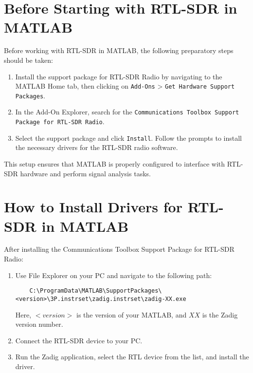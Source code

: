 \section*{Before Starting with RTL-SDR in MATLAB}

Before working with RTL-SDR in MATLAB, the following preparatory steps should be taken:

\begin{enumerate}
    \item Install the support package for RTL-SDR Radio by navigating to the MATLAB Home tab, then clicking on \texttt{Add-Ons} > \texttt{Get Hardware Support Packages}.
    \item In the Add-On Explorer, search for the \texttt{Communications Toolbox Support Package for RTL-SDR Radio}.
    \item Select the support package and click \texttt{Install}. Follow the prompts to install the necessary drivers for the RTL-SDR radio software.
\end{enumerate}
This setup ensures that MATLAB is properly configured to interface with RTL-SDR hardware and perform signal analysis tasks.

\section*{How to Install Drivers for RTL-SDR in MATLAB}

After installing the Communications Toolbox Support Package for RTL-SDR Radio:

\begin{enumerate}
    \item Use File Explorer on your PC and navigate to the following path:
    \begin{verbatim}
    C:\ProgramData\MATLAB\SupportPackages\<version>\3P.instrset\zadig.instrset\zadig-XX.exe
    \end{verbatim}
    Here, \( <version> \) is the version of your MATLAB, and \( XX \) is the Zadig version number.
    
    \item Connect the RTL-SDR device to your PC.
    
    \item Run the Zadig application, select the RTL device from the list, and install the driver.
\end{enumerate}

